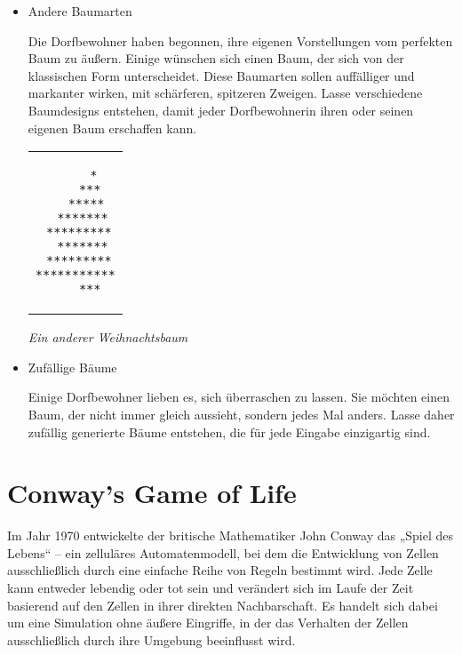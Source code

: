 \documentclass[12pt,a4paper]{article}
\begin{document}
\begin{itemize}
\begin{itemize}
\begin{center}
\begin{tcolorbox}[frame empty,nobeforeafter,colback=gray!5]
        \centering%
        \begin{tabular}{c}
        \begin{lstlisting}[escapeinside={/!}{!/}]
  ~
 ~*/!\textcolor{red}{o}!/
*/!\textcolor{blue}{o}\textcolor{orange}{o}!/~*
  *
        \end{lstlisting}
        \end{tabular}
        \end{tcolorbox}
        \textit{\small Weihnachtsbaum mit Schnee und Lichterkette}
        \end{center}
    \end{itemize}
    \item Andere Baumarten\par
    Die Dorfbewohner haben begonnen, ihre eigenen Vorstellungen vom perfekten Baum zu äußern. Einige wünschen sich einen Baum, der sich von der klassischen Form unterscheidet. Diese Baumarten sollen auffälliger und markanter wirken, mit schärferen, spitzeren Zweigen. Lasse verschiedene Baumdesigns entstehen, damit jeder Dorfbewohnerin ihren oder seinen eigenen Baum erschaffen kann.
    \begin{center}
    \begin{tcolorbox}[frame empty,nobeforeafter,colback=gray!5]
    \centering%
    \begin{tabular}{c}
    \begin{lstlisting}
     *
    ***
   *****
  *******
 *********
  *******
 *********
***********
    ***
    \end{lstlisting}
    \end{tabular}
    \end{tcolorbox}
    \textit{\small Ein anderer Weihnachtsbaum}
    \end{center}
    \item Zufällige Bäume\par
    Einige Dorfbewohner lieben es, sich überraschen zu lassen. Sie möchten einen Baum, der nicht immer gleich aussieht, sondern jedes Mal anders. Lasse daher zufällig generierte Bäume entstehen, die für jede Eingabe einzigartig sind. 
\end{itemize}
\newpage

%
\section{Conway's Game of Life}

Im Jahr 1970 entwickelte der britische Mathematiker John Conway das „Spiel des Lebens“ – ein zelluläres Automatenmodell, bei dem die Entwicklung von Zellen ausschließlich durch eine einfache Reihe von Regeln bestimmt wird. Jede Zelle kann entweder lebendig oder tot sein und verändert sich im Laufe der Zeit basierend auf den Zellen in ihrer direkten Nachbarschaft. Es handelt sich dabei um eine Simulation ohne äußere Eingriffe, in der das Verhalten der Zellen ausschließlich durch ihre Umgebung beeinflusst wird.
\end{document}

